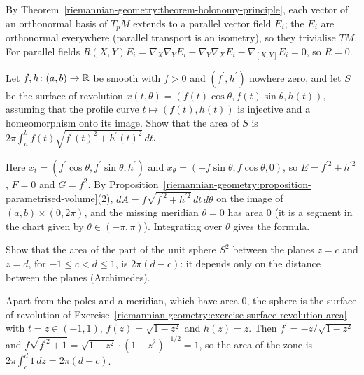 \begin{solution}
By Theorem~\ref{riemannian-geometry:theorem-holonomy-principle}, each vector of an orthonormal basis of $T_pM$ extends to a parallel vector field $E_i$; the $E_i$ are orthonormal everywhere (parallel transport is an isometry), so they
trivialise $TM$. For parallel fields $R(X, Y)E_i = \nabla_X\nabla_YE_i - \nabla_Y\nabla_XE_i - \nabla_{[X,Y]}E_i = 0$, so $R = 0$.
\end{solution}

\begin{exercise}\label{riemannian-geometry:exercise-surface-revolution-area}
Let $f, h \colon (a, b) \to \mathbb{R}$ be smooth with $f > 0$ and $(f^{\prime}, h^{\prime})$ nowhere zero, and let $S$ be the surface of revolution
$x(t, \theta) = (f(t)\cos\theta, f(t)\sin\theta, h(t))$, assuming that the profile curve $t \mapsto (f(t), h(t))$ is injective and a homeomorphism onto its image. Show that the area of $S$ is $2\pi\int_a^bf(t)\sqrt{f^{\prime}(t)^2 + h^{\prime}(t)^2}\,dt$.
\end{exercise}

\begin{solution}
Here $x_t = (f^{\prime}\cos\theta, f^{\prime}\sin\theta, h^{\prime})$ and $x_\theta = (-f\sin\theta, f\cos\theta, 0)$, so $E = f^{\prime 2} + h^{\prime 2}$, $F = 0$ and $G = f^2$.
By Proposition~\ref{riemannian-geometry:proposition-parametrised-volume}(2), $dA = f\sqrt{f^{\prime 2} + h^{\prime 2}}\,dt\,d\theta$ on the image of
$(a, b) \times (0, 2\pi)$, and the missing meridian $\theta = 0$ has area $0$ (it is a segment in the chart given by $\theta \in (-\pi, \pi)$). Integrating over $\theta$
gives the formula.
\end{solution}

\begin{exercise}\label{riemannian-geometry:exercise-archimedes}
Show that the area of the part of the unit sphere $S^2$ between the planes $z = c$ and $z = d$, for $-1 \leq c < d \leq 1$, is $2\pi(d - c)$: it depends only on the
distance between the planes (Archimedes).
\end{exercise}

\begin{solution}
Apart from the poles and a meridian, which have area $0$, the sphere is the surface of revolution of Exercise~\ref{riemannian-geometry:exercise-surface-revolution-area}
with $t = z \in (-1, 1)$, $f(z) = \sqrt{1 - z^2}$ and $h(z) = z$. Then $f^{\prime} = -z/\sqrt{1 - z^2}$ and $f\sqrt{f^{\prime 2} + 1} = \sqrt{1 - z^2} \cdot (1 - z^2)^{-1/2} = 1$, so
the area of the zone is $2\pi\int_c^d1\,dz = 2\pi(d - c)$.
\end{solution}

